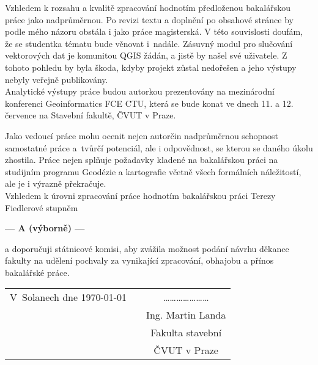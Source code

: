 \documentclass[czech,11pt,a4paper]{article}
\begin{document}
Vzhledem k rozsahu a kvalitě zpracování hodnotím předloženou
bakalářskou práce jako nadprůměrnou. Po revizi textu a doplnění po
obsahové stránce by podle mého názoru obstála i jako práce
magisterská. V této souvislosti doufám, že se studentka tématu bude
věnovat i~nadále. Zásuvný modul pro slučování vektorových dat je
komunitou QGIS žádán, a jistě by našel své uživatele. Z tohoto pohledu
by byla škoda, kdyby projekt zůstal nedořešen a jeho výstupy nebyly
veřejně publikovány.
\\

Analytické výstupy práce budou autorkou prezentovány na mezinárodní
konferenci Geoinformatics FCE CTU, která se bude konat ve dnech 11. a
12. července na Stavební fakultě, ČVUT v Praze.
\\

\newpage

Jako vedoucí práce mohu ocenit nejen autorčin nadprůměrnou schopnost
samostatné práce a~tvůrčí potenciál, ale i odpovědnost, se kterou se
daného úkolu zhostila. Práce nejen splňuje požadavky kladené na
bakalářskou práci na studijním programu Geodézie a kartografie včetně
všech formálních náležitostí, ale je i výrazně překračuje. \\

Vzhledem k úrovni zpracování práce hodnotím bakalářskou práci Terezy
Fiedlerové stupněm

\begin{center}
{\bf --- A (výborně)  ---}
\end{center}

a doporučuji státnicové komisi, aby zvážila možnost podání návrhu
děkance fakulty na udělení pochvaly za vynikající zpracování, obhajobu
a přínos bakalářské práce.

\vspace{2cm}

\begin{tabular}{lp{}c}
V~Solanech dne \today & & \ldots\ldots\ldots\ldots\ldots\ldots\ldots \\
& & Ing. Martin Landa \\
& & Fakulta stavební \\
& & ČVUT v Praze \\
\end{tabular}
\end{document}
